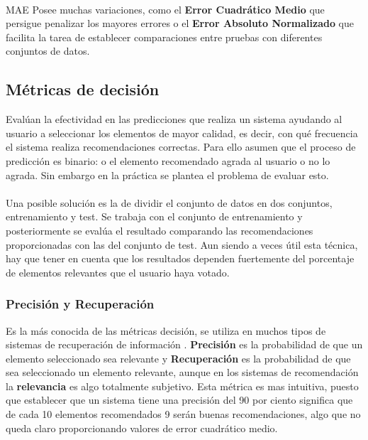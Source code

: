 \documentclass[12pt,letterpaper,oneside] {memoir}
\begin{document}
\paragraph{}
MAE Posee muchas variaciones, como el \textbf{Error Cuadrático Medio} que persigue penalizar los mayores errores o el \textbf{Error Absoluto Normalizado} que facilita la tarea de establecer comparaciones entre pruebas con diferentes conjuntos de datos.

\subsection{Métricas de decisión}

Evalúan la efectividad en las predicciones que realiza un sistema ayudando al usuario a seleccionar los elementos de mayor calidad, es decir, con qué frecuencia el sistema realiza recomendaciones correctas. Para ello asumen que el proceso de predicción es binario: o el elemento recomendado agrada al usuario o no lo agrada. Sin embargo en la práctica se plantea el problema de evaluar esto. 
\paragraph{}
Una posible solución es la de dividir el conjunto de datos en dos conjuntos, entrenamiento y test. Se trabaja con el conjunto de entrenamiento y posteriormente se evalúa el resultado comparando las recomendaciones proporcionadas con las del conjunto de test. Aun siendo a veces útil esta técnica, hay que tener en cuenta que los resultados dependen fuertemente del porcentaje de elementos relevantes que el usuario haya votado. 

\subsubsection{Precisión y Recuperación}

Es la más conocida de las métricas decisión, se utiliza en muchos tipos de sistemas de recuperación de información \citep{Herlocker2004, Sarwar2001, Basu1998, Billsus1998}. \textbf{Precisión} es la probabilidad de que un elemento seleccionado sea relevante y \textbf{Recuperación} es la probabilidad de que sea seleccionado un elemento relevante, aunque en los sistemas de recomendación la \textbf{relevancia} es algo totalmente subjetivo. Esta métrica es mas intuitiva, puesto que establecer que un sistema tiene una precisión del 90 por ciento significa que de cada 10 elementos recomendados 9 serán buenas recomendaciones, algo que no queda claro proporcionando valores de error cuadrático medio.
\end{document}

